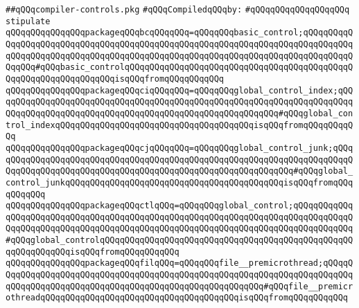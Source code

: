 \label{src/lib/compiler/toplevel/main/compiler-controls.pkg}
\verb|##qQQqcompiler-controls.pkg|\newline
\newline
\verb|#qQQqCompiledqQQqby:|\newline
\verb|#qQQqqQQqqQQqqQQqqQQq|\newline
\newline
\newline
\newline
\verb|stipulate|\newline
\verb|qQQqqQQqqQQqqQQqpackageqQQqbcqQQqqQQq=qQQqqQQqbasic_control;qQQqqQQqqQQqqQQqqQQqqQQqqQQqqQQqqQQqqQQqqQQqqQQqqQQqqQQqqQQqqQQqqQQqqQQqqQQqqQQqqQQqqQQqqQQqqQQqqQQqqQQqqQQqqQQqqQQqqQQqqQQqqQQqqQQqqQQqqQQqqQQqqQQqqQQqqQQq#qQQqbasic_controlqQQqqQQqqQQqqQQqqQQqqQQqqQQqqQQqqQQqqQQqqQQqqQQqqQQqqQQqqQQqqQQqqQQqisqQQqfromqQQqqQQqqQQq|\newline
\verb|qQQqqQQqqQQqqQQqpackageqQQqciqQQqqQQq=qQQqqQQqglobal_control_index;qQQqqQQqqQQqqQQqqQQqqQQqqQQqqQQqqQQqqQQqqQQqqQQqqQQqqQQqqQQqqQQqqQQqqQQqqQQqqQQqqQQqqQQqqQQqqQQqqQQqqQQqqQQqqQQqqQQqqQQqqQQqqQQq#qQQqglobal_control_indexqQQqqQQqqQQqqQQqqQQqqQQqqQQqqQQqqQQqqQQqisqQQqfromqQQqqQQqqQQq|\newline
\verb|qQQqqQQqqQQqqQQqpackageqQQqcjqQQqqQQq=qQQqqQQqglobal_control_junk;qQQqqQQqqQQqqQQqqQQqqQQqqQQqqQQqqQQqqQQqqQQqqQQqqQQqqQQqqQQqqQQqqQQqqQQqqQQqqQQqqQQqqQQqqQQqqQQqqQQqqQQqqQQqqQQqqQQqqQQqqQQqqQQqqQQq#qQQqglobal_control_junkqQQqqQQqqQQqqQQqqQQqqQQqqQQqqQQqqQQqqQQqqQQqisqQQqfromqQQqqQQqqQQq|\newline
\verb|qQQqqQQqqQQqqQQqpackageqQQqctlqQQq=qQQqqQQqglobal_control;qQQqqQQqqQQqqQQqqQQqqQQqqQQqqQQqqQQqqQQqqQQqqQQqqQQqqQQqqQQqqQQqqQQqqQQqqQQqqQQqqQQqqQQqqQQqqQQqqQQqqQQqqQQqqQQqqQQqqQQqqQQqqQQqqQQqqQQqqQQqqQQqqQQqqQQq#qQQqglobal_controlqQQqqQQqqQQqqQQqqQQqqQQqqQQqqQQqqQQqqQQqqQQqqQQqqQQqqQQqqQQqqQQqisqQQqfromqQQqqQQqqQQq|\newline
\verb|qQQqqQQqqQQqqQQqpackageqQQqfilqQQq=qQQqqQQqfile__premicrothread;qQQqqQQqqQQqqQQqqQQqqQQqqQQqqQQqqQQqqQQqqQQqqQQqqQQqqQQqqQQqqQQqqQQqqQQqqQQqqQQqqQQqqQQqqQQqqQQqqQQqqQQqqQQqqQQqqQQqqQQqqQQqqQQq#qQQqfile__premicrothreadqQQqqQQqqQQqqQQqqQQqqQQqqQQqqQQqqQQqqQQqisqQQqfromqQQqqQQqqQQq|\newline

